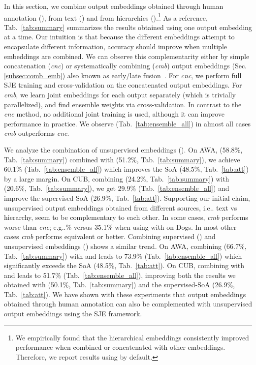 \documentclass[10pt,twocolumn,letterpaper]{article}
\makeatletter
\newcommand{\myparagraph}[1]{\vspace{2pt}\noindent{\bf #1}}
\newcommand{\SJE}{SJE\xspace}
\DeclareRobustCommand\onedot{\futurelet\@let@token\@onedot}
\def\@onedot{\ifx\@let@token.\else.\null\fi\xspace}
\def\eg{{e.g}\onedot} \def\Eg{{E.g}\onedot}
\def\ie{{i.e}\onedot} \def\Ie{{I.e}\onedot}
\makeatother
\begin{document}
\myparagraph{Combining Output Embeddings.}
In this section, we combine output embeddings obtained through human annotation (), from text () and from hierarchies ().\footnote{We empirically found that the hierarchical embeddings  consistently improved performance when combined or concatenated with other embeddings. Therefore, we report results using  by default.}
As a reference, Tab.~\ref{tab:summary} summarizes the results obtained using one output embedding at a time. Our intuition is that because the different embeddings attempt to encapsulate different information, accuracy should improve when multiple embeddings are combined. 
We can observe this complementarity either by simple concatenation (\emph{cnc}) or systematically combining (\emph{cmb}) output embeddings (Sec.\ref{subsec:comb_emb}) also known as early/late fusion~\cite{APHS15}. 
For \emph{cnc}, we perform full SJE training and cross-validation on the concatenated output embeddings.
For \emph{cmb}, we learn joint embeddings  for each output separately (which is trivially parallelized), and find ensemble weights  via cross-validation.
In contrast to the \emph{cnc} method, no additional joint training is used, although it can improve performance in practice. 
We observe (Tab.~\ref{tab:ensemble_all}) in almost all cases \emph{cmb} outperforms \emph{cnc}.


We analyze the combination of unsupervised embeddings (). On AWA,  (58.8\%, Tab.~\ref{tab:summary}) combined with  (51.2\%, Tab.~\ref{tab:summary}), 
we achieve 60.1\% (Tab.~\ref{tab:ensemble_all}) which improves the SoA (48.5\%, Tab.~\ref{tab:att}) by a large margin.
On CUB, combining  (24.2\%, Tab.~\ref{tab:summary}) with  (20.6\%, Tab.~\ref{tab:summary}), 
we get 29.9\% (Tab.~\ref{tab:ensemble_all}) 
and improve the supervised-SoA  (26.9\%, Tab.~\ref{tab:att}).
Supporting our initial claim, unsupervised output embeddings obtained from different sources, \ie text vs hierarchy, seem to be complementary to each other.
In some cases, \textit{cmb} performs worse than \textit{cnc}; \eg 28.2\% versus 35.1\% when using  with  on Dogs.
In most other cases \textit{cmb} performs equivalent or better.
Combining supervised () and unsupervised embeddings () shows a similar trend. On AWA, combining  (66.7\%, Tab.~\ref{tab:summary}) with  and  leads to 73.9\% (Tab.~\ref{tab:ensemble_all}) which significantly exceeds the SoA (48.5\%, Tab.~\ref{tab:att}). On CUB, combining  with  and   leads to 51.7\% (Tab.~\ref{tab:ensemble_all}),
improving both the results we obtained with  (50.1\%, Tab.~\ref{tab:summary}) and the supervised-SoA (26.9\%, Tab.~\ref{tab:att}). We have shown with these experiments that output embeddings obtained through human annotation can also be complemented with unsupervised output embeddings using the \SJE framework.
\end{document}
